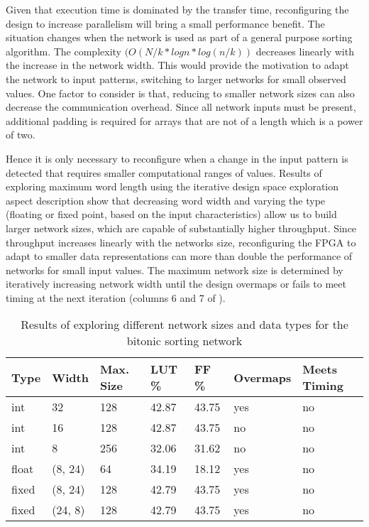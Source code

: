 Given that execution time is dominated by the transfer time,
reconfiguring the design to increase parallelism will bring a small
performance benefit.  The situation changes when the network is used
as part of a general purpose sorting algorithm. The complexity $(
O(N/k * logn * log(n/k)) $ decreases linearly with the increase in the
network width. This would provide the motivation to adapt the network
to input patterns, switching to larger networks for small observed
values. One factor to consider is that, reducing to smaller network
sizes can also decrease the communication overhead. Since all network
inputs must be present, additional padding is required for arrays that
are not of a length which is a power of two.

Hence it is only necessary to reconfigure when a change in the input
pattern is detected that requires smaller computational ranges of
values. Results of exploring maximum word length using the iterative
design space exploration aspect description show that decreasing word
width and varying the type (floating or fixed point, based on the
input characteristics) allow us to build larger network sizes, which
are capable of substantially higher throughput. Since throughput
increases linearly with the networks size, reconfiguring the FPGA to
adapt to smaller data representations can more than double the
performance of networks for small input values. The maximum network
size is determined by iteratively increasing network width until the
design overmaps or fails to meet timing at the next iteration (columns
6 and 7 of ).

\begin{table}[!ht]
  \begin{tabularx}{\textwidth}{X | X | X | X | X | p{2cm} |  X}
    \textbf{Type} & \textbf{Width} & \textbf{Max. Size} & \textbf{LUT \%} & \textbf{FF \%} & \textbf{Overmaps} & \textbf{Meets Timing} \\
    \hline
    \hline
    int           & 32             & 128                & 42.87           & 43.75          & yes               & no                    \\
    int           & 16             & 128                & 42.87           & 43.75          & no                & no                    \\
    int           & 8              & 256                & 32.06           & 31.62          & no                & no                    \\
    float         & (8, 24)        & 64                 & 34.19           & 18.12          & yes               & no                    \\
    fixed         & (8, 24)        & 128                & 42.79           & 43.75          & yes               & no                    \\
    fixed         & (24, 8)        & 128                & 42.79           & 43.75          & yes               & no                    \\
  \end{tabularx}
  \caption{Results of exploring different network sizes and data types for the bitonic sorting network}
  \label{table:bsort-bitwidth}
\end{table}


